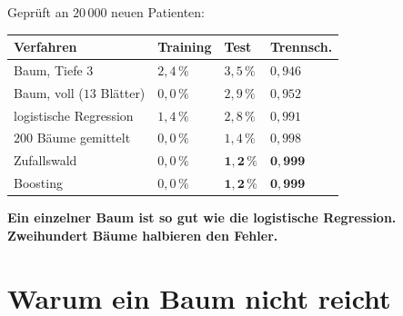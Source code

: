 \begin{merksatz}
Geprüft an $20\,000$ neuen Patienten:
\begin{center}
{\small
\renewcommand{\arraystretch}{1.48}
\begin{tabular}{@{}P{3.4cm}P{1.8cm}P{1.6cm}P{1.6cm}@{}}
\toprule
\textbf{Verfahren} & \textbf{Training} & \textbf{Test} & \textbf{Trennsch.}\\
\midrule
Baum, Tiefe 3 & $2{,}4\,\%$ & $3{,}5\,\%$ & $0{,}946$\\
Baum, voll ($13$ Blätter) & $0{,}0\,\%$ & $2{,}9\,\%$ & $0{,}952$\\
logistische Regression & $1{,}4\,\%$ & $2{,}8\,\%$ & $0{,}991$\\
\midrule
$200$ Bäume gemittelt & $0{,}0\,\%$ & $1{,}4\,\%$ & $0{,}998$\\
Zufallswald & $0{,}0\,\%$ & $\mathbf{1{,}2\,\%}$ & $\mathbf{0{,}999}$\\
Boosting & $0{,}0\,\%$ & $\mathbf{1{,}2\,\%}$ & $\mathbf{0{,}999}$\\
\bottomrule
\end{tabular}}
\end{center}

\begin{center}
\begin{minipage}{0.9\textwidth}
\textbf{Ein einzelner Baum ist so gut wie die logistische Regression. Zweihundert Bäume halbieren den Fehler.}
\end{minipage}
\end{center}

\begin{center}
\begin{minipage}{0.88\textwidth}
\end{minipage}
\end{center}
\end{merksatz}

\section{Warum ein Baum nicht reicht}

